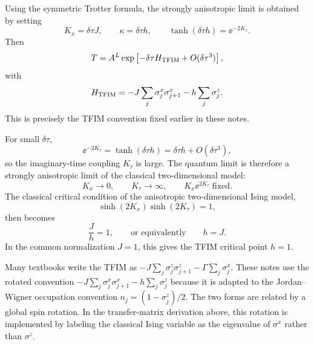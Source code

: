 Using the symmetric Trotter formula, the strongly anisotropic limit is obtained
by setting
\begin{equation}
\label{eq:ising-tfim-parameter-scaling}
    K_x=\delta\tau J,
    \qquad
    \kappa=\delta\tau h,
    \qquad
    \tanh(\delta\tau h)=\ee^{-2K_\tau}.
\end{equation}
Then
\begin{equation}
\label{eq:2d-ising-transfer-tfim-limit}
    T
    =
    A^L
    \exp\left[-\delta\tau H_{\rm TFIM}+O(\delta\tau^3)\right],
\end{equation}
with
\begin{equation}
\label{eq:transfer-chapter-tfim-hamiltonian}
    H_{\rm TFIM}
    =
    -J\sum_j\sigma_j^x\sigma_{j+1}^x
    -h\sum_j\sigma_j^z .
\end{equation}
This is precisely the TFIM convention fixed earlier in these notes.

For small $\delta\tau$,
\begin{equation}
\label{eq:large-vertical-coupling}
    \ee^{-2K_\tau}
    =
    \tanh(\delta\tau h)
    =
    \delta\tau h+O(\delta\tau^3),
\end{equation}
so the imaginary-time coupling $K_\tau$ is large. The quantum limit is therefore
a strongly anisotropic limit of the classical two-dimensional model:
\begin{equation}
    K_x\to0,
    \qquad
    K_\tau\to\infty,
    \qquad
    K_x\ee^{2K_\tau}\;\text{fixed}.
\end{equation}
The classical critical condition of the anisotropic two-dimensional Ising model,
\begin{equation}
\label{eq:2d-ising-critical-condition}
    \sinh(2K_x)\sinh(2K_\tau)=1,
\end{equation}
then becomes
\begin{equation}
\label{eq:tfim-critical-from-ising}
    \frac{J}{h}=1,
    \qquad
    \text{or equivalently}\qquad
    h=J.
\end{equation}
In the common normalization $J=1$, this gives the TFIM critical point $h=1$.

\begin{remark}
Many textbooks write the TFIM as
$-J\sum_j\sigma_j^z\sigma_{j+1}^z-\Gamma\sum_j\sigma_j^x$. These notes use the
rotated convention
$-J\sum_j\sigma_j^x\sigma_{j+1}^x-h\sum_j\sigma_j^z$ because it is adapted to the
Jordan--Wigner occupation convention $n_j=(1-\sigma_j^z)/2$. The two forms are
related by a global spin rotation. In the transfer-matrix derivation above, this
rotation is implemented by labeling the classical Ising variable as the eigenvalue
of $\sigma^x$ rather than $\sigma^z$.
\end{remark}

